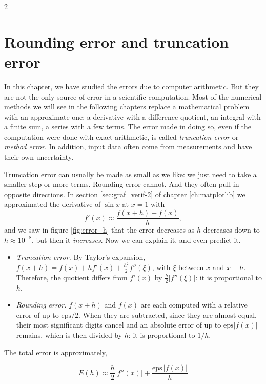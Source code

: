\begin{paracol}{2}
\section[Rounding error and truncation error]{Rounding error and truncation error}\label{sec:red_trunc-2}
In this chapter, we have studied the errors due to computer arithmetic. But they are not the only source of error in a scientific computation. Most of the numerical methods we will see in the following chapters replace a mathematical problem with an approximate one: a derivative with a difference quotient, an integral with a finite sum, a series with a few terms. The error made in doing so, even if the computation were done with exact arithmetic, is called \emph{truncation error} or \emph{method error}. In addition, input data often come from measurements and have their own uncertainty.

Truncation error can usually be made as small as we like: we just need to take a smaller step or more terms. Rounding error cannot. And they often pull in opposite directions. In section \ref{sec:graf_verif-2} of chapter \ref{ch:matplotlib} we approximated the derivative of $\sin x$ at $x=1$ with
$$f'(x)\approx\frac{f(x+h)-f(x)}{h},$$
and we saw in figure \ref{fig:error_h} that the error decreases as $h$ decreases down to $h\approx10^{-8}$, but then it \emph{increases}. Now we can explain it, and even predict it.

\begin{itemize}
\item \emph{Truncation error.} By Taylor's expansion, $f(x+h)=f(x)+hf'(x)+\frac{h^2}{2}f''(\xi)$, with $\xi$ between $x$ and $x+h$. Therefore, the quotient differs from $f'(x)$ by $\frac{h}{2}\vert f''(\xi)\vert$: it is proportional to $h$.
\item \emph{Rounding error.} $f(x+h)$ and $f(x)$ are each computed with a relative error of up to $\text{eps}/2$. When they are subtracted, since they are almost equal, their most significant digits cancel and an absolute error of up to $\text{eps}\vert f(x)\vert$ remains, which is then divided by $h$: it is proportional to $1/h$.
\end{itemize}
The total error is approximately,
\end{paracol}
\begin{equation*}
E(h)\approx \frac{h}{2}\vert f''(x)\vert+\frac{\text{eps}\,\vert f(x)\vert}{h}
\end{equation*}
